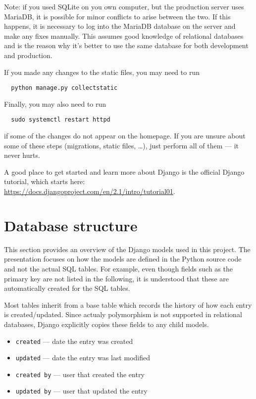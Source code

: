 \documentclass{article}
\begin{document}
Note: if you used SQLite on you own computer, but the production server uses MariaDB, it is possible for minor conflicts to arise between the two. If this happens, it is necessary to log into the MariaDB database on the server and make any fixes manually. This assumes good knowledge of relational databases and is the reason why it's better to use the same database for both development and production.

If you made any changes to the static files, you may need to run
\begin{lstlisting}
  python manage.py collectstatic
\end{lstlisting}
Finally, you may also need to run
\begin{lstlisting}
  sudo systemctl restart httpd
\end{lstlisting}
if some of the changes do not appear on the homepage. If you are unsure about some of these steps (migrations, static files, \ldots), just perform all of them --- it never hurts.

A good place to get started and learn more about Django is the official Django tutorial, which starts here: \url{https://docs.djangoproject.com/en/2.1/intro/tutorial01}.

\section{Database structure}

This section provides an overview of the Django models used in this project. The presentation focuses on how the models are defined in the Python source code and not the actual SQL tables. For example, even though fields such as the primary key are not listed in the following, it is understood that these are automatically created for the SQL tables.

Most tables inherit from a base table which records the history of how each entry is created/updated. Since actualy polymorphism is not supported in relational databases, Django explicitly copies these fields to any child models.
\begin{tcolorbox}[colback=green!5,colframe=green!40!black,title=Base]
  \begin{itemize}
  \item \texttt{created} --- date the entry was created
  \item \texttt{updated} --- date the entry was last modified
  \item \texttt{created by} --- user that created the entry
  \item \texttt{updated by} --- user that updated the entry
  \end{itemize}
\end{tcolorbox}
\end{document}
